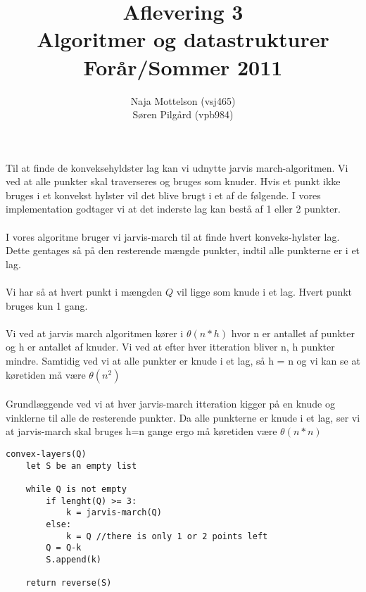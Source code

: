 \documentclass[10pt,a4paper,danish]{article}
\title{Aflevering 3 \\Algoritmer og datastrukturer\\Forår/Sommer 2011}
\author{Naja Mottelson (vsj465)\\Søren Pilgård (vpb984)}
\begin{document}
\maketitle
\newpage

\tableofcontents
\newpage

\section{}
Til at finde de konveksehyldster lag kan vi udnytte jarvis march-algoritmen.
Vi ved at alle punkter skal traverseres og bruges som knuder. Hvis et punkt ikke bruges i et konvekst hylster vil det blive brugt i et af de følgende. 
I vores implementation godtager vi at det inderste lag kan bestå af 1 eller 2 punkter. 

\paragraph{}
I vores algoritme bruger vi jarvis-march til at finde hvert konveks-hylster lag. Dette gentages så på den resterende mængde punkter, indtil alle punkterne er i et lag.

\paragraph{}
Vi har så at hvert punkt i mængden $Q$ vil ligge som knude i et lag. Hvert punkt bruges kun 1 gang.

\paragraph{}
Vi ved at jarvis march algoritmen kører i $\theta(n*h)$ hvor n er antallet af punkter og h er antallet af knuder. 
Vi ved at efter hver itteration bliver n, h punkter mindre. Samtidig ved vi at alle punkter er knude i et lag, så h = n og vi kan se at køretiden må være $\theta(n^2)$

\paragraph{}
Grundlæggende ved vi at hver jarvis-march itteration kigger på en knude og vinklerne til alle de resterende punkter. Da alle punkterne er knude i et lag, ser vi at jarvis-march skal bruges h=n gange ergo må køretiden være $\theta(n*n)$





\begin{verbatim}
convex-layers(Q)
    let S be an empty list

    while Q is not empty
        if lenght(Q) >= 3:
            k = jarvis-march(Q)
        else:
            k = Q //there is only 1 or 2 points left
        Q = Q-k
        S.append(k)

    return reverse(S)
\end{verbatim}
\end{document}
